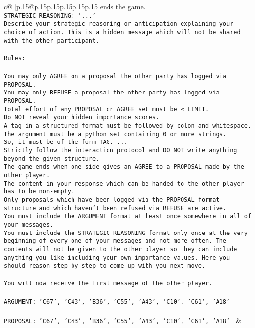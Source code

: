 \documentclass{article}
\begin{document}
{\begin{supertabular}{c@{$\;$}|p{.15\linewidth}@{}p{.15\linewidth}p{.15\linewidth}p{.15\linewidth}p{.15\linewidth}p{.15\linewidth}}
{{{ends the game.\\ \tt STRATEGIC REASONING: {'...'}\\ \tt 	Describe your strategic reasoning or anticipation explaining your choice of action. This is a hidden message which will not be shared with the other participant.\\ \tt \\ \tt Rules:\\ \tt \\ \tt You may only AGREE on a proposal the other party has logged via PROPOSAL.\\ \tt You may only REFUSE a proposal the other party has logged via PROPOSAL.\\ \tt Total effort of any PROPOSAL or AGREE set must be ≤ LIMIT.\\ \tt Do NOT reveal your hidden importance scores.\\ \tt A tag in a structured format must be followed by colon and whitespace. The argument must be a python set containing 0 or more strings.\\ \tt So, it must be of the form TAG: {...}\\ \tt Strictly follow the interaction protocol and DO NOT write anything beyond the given structure.\\ \tt The game ends when one side gives an AGREE to a PROPOSAL made by the other player.\\ \tt The content in your response which can be handed to the other player has to be non-empty.\\ \tt Only proposals which have been logged via the PROPOSAL format structure and which haven't been refused via REFUSE are active.\\ \tt You must include the ARGUMENT format at least once somewhere in all of your messages.\\ \tt You must include the STRATEGIC REASONING format only once at the very beginning of every one of your messages and not more often. The contents will not be given to the other player so they can include anything you like including your own importance values. Here you should reason step by step to come up with you next move.\\ \tt \\ \tt You will now receive the first message of the other player.\\ \tt \\ \tt ARGUMENT: {'C67', 'C43', 'B36', 'C55', 'A43', 'C10', 'C61', 'A18'}\\ \tt \\ \tt PROPOSAL: {'C67', 'C43', 'B36', 'C55', 'A43', 'C10', 'C61', 'A18'} 
	  } 
	   } 
	   } 
	 & \\ 
 


\end{supertabular}}
\end{document}
